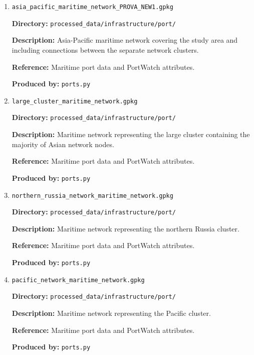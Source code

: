 \documentclass[11pt,a4paper]{article}
\begin{document}
\begin{enumerate}
\medskip

\item \texttt{asia\_pacific\_maritime\_network\_PROVA\_NEW1.gpkg}\par
\textbf{Directory:} \texttt{processed\_data/infrastructure/port/}\par
\textbf{Description:} Asia-Pacific maritime network covering the study area and including connections between the separate network clusters.\par
\textbf{Reference:} Maritime port data and PortWatch attributes.\par
\textbf{Produced by:} \texttt{ports.py}\par

\medskip

\item \texttt{large\_cluster\_maritime\_network.gpkg}\par
\textbf{Directory:} \texttt{processed\_data/infrastructure/port/}\par
\textbf{Description:} Maritime network representing the large cluster containing the majority of Asian network nodes.\par
\textbf{Reference:} Maritime port data and PortWatch attributes.\par
\textbf{Produced by:} \texttt{ports.py}\par

\medskip

\item \texttt{northern\_russia\_network\_maritime\_network.gpkg}\par
\textbf{Directory:} \texttt{processed\_data/infrastructure/port/}\par
\textbf{Description:} Maritime network representing the northern Russia cluster.\par
\textbf{Reference:} Maritime port data and PortWatch attributes.\par
\textbf{Produced by:} \texttt{ports.py}\par

\medskip

\item \texttt{pacific\_network\_maritime\_network.gpkg}\par
\textbf{Directory:} \texttt{processed\_data/infrastructure/port/}\par
\textbf{Description:} Maritime network representing the Pacific cluster.\par
\textbf{Reference:} Maritime port data and PortWatch attributes.\par
\textbf{Produced by:} \texttt{ports.py}\par


\end{enumerate}
\end{document}
